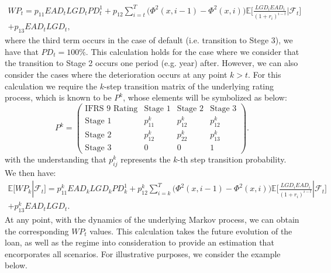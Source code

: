 \documentclass[11pt,reqno]{article}
\theoremstyle{definition}
\begin{document}
\begin{eqnarray} \label{weightedprov}
WP_t = p_{11} EAD_t LGD_t PD^1_t + p_{12} \sum_{i=t}^{T}\big(\Phi^2(x,i-1)  -\Phi^2(x,i)\big)\mathbb{E} \Big[\frac{LGD_i  EAD_i}{(1+r_i)^{i-t}} | \mathcal{F}_t \Big]  \nonumber\\ + p_{13}EAD_tLGD_t,
\end{eqnarray}
where the third term occurs in the case of default (i.e. transition to Stege 3), we have that $PD_t=100\%$. This calculation holds for the case where we consider that the transition to Stage 2 occurs one period (e.g. year) after. However, we can also consider the cases where the deterioration occurs at any point $k>t$. For this calculation we require the $k$-step transition matrix of the underlying rating process, which is known to be $P^k$, whose elements will be symbolized as below:
$$
P^k=\left(  \begin{array}{c|ccc}
\text{IFRS 9 Rating} & \text{Stage 1} & \text{Stage 2} & \text{Stage 3}\\
\hline
\text{Stage 1} & p^k_{11} & p^k_{12} & p^k_{12}\\
\text{Stage 2} & p^k_{12} & p^k_{22} & p^k_{13}  \\
\text{Stage 3} & 0 & 0 &1
\end{array}
\right).
$$
with the understanding that $p^k_{ij}$ represents the $k$-th step transition probability. We then have:
\begin{eqnarray} \label{weightedprovk}
\mathbb{E}[WP_k|\mathcal{F}_t] = p^k_{11} EAD_k LGD_k PD^1_k + p^k_{12} \sum_{i=k}^{T}\big(\Phi^2(x,i-1)  -\Phi^2(x,i)\big)\mathbb{E} \Big[\frac{LGD_i  EAD_i}{(1+r_i)^{i-t}} | \mathcal{F}_t \Big] \nonumber \\
+ p^k_{13}EAD_tLGD_t.
\end{eqnarray}
 At any point, with the dynamics of the underlying Markov process, we can obtain the corresponding $WP_t$ values. This calculation takes the future evolution of the loan, as well as the regime into consideration to provide an estimation that encorporates all scenarios.
 For illustrative purposes, we consider the example below.
\end{document}
